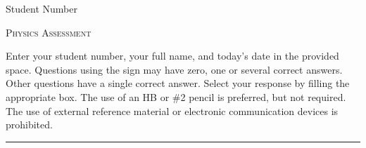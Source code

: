 \documentclass[
    11pt,
    fleqn,
]{scrartcl}
\newlength{\mylen}
\begin{document}









\begin{examcopy}[2]

\setlength{\mylen}{\linewidth}
\addtolength{\mylen}{-17em}
\begin{minipage}{\linewidth}
    \centering
    \begin{minipage}{15.5em}
        \centering
        Student Number \\
    \end{minipage}
    \begin{minipage}{\mylen}
        \centering
        \textsc{Physics Assessment} \\
    \end{minipage}
\end{minipage}

\null\hfill\parbox[c]{0.9\linewidth}{\small
    Enter your student number, your full name, and today's date in the provided space.
    Questions using the sign \multiSymbole{} may have zero, one or several correct answers.
    Other questions have a single correct answer.
    Select your response by filling the appropriate box.
    The use of an HB or \#2 pencil is preferred, but not required.
    The use of external reference material or electronic communication devices is prohibited.
}\hfill\null

\rule[0pt]{\linewidth}{0.5pt}

\begin{multicols}{2}



\end{multicols}

\AMCcleardoublepage
\end{examcopy}
\end{document}
